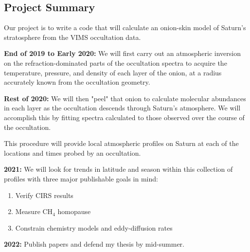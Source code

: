 \documentclass[preprint]{aastex}
\begin{document}
\begin{multicols}{2}
\vspace{-9mm}
\section{Project Summary}
\vspace{-3mm}

Our project is to write a code that will calculate an onion-skin model of
Saturn's stratosphere from the VIMS occultation data.

{\bf End of 2019 to Early 2020:} We will first carry out an atmospheric inversion on the
refraction-dominated parts of the occultation spectra to acquire the
temperature, pressure, and density of each layer of the onion, at a radius
accurately known from the occultation geometry. 

{\bf Rest of 2020:} We will then "peel" that onion to calculate molecular
abundances in each layer as the occultation descends through Saturn's
atmosphere. We will accomplish this by fitting spectra calculated to those
observed over the course of the occultation. 

This procedure will provide local atmospheric profiles on Saturn at each of the
locations and times probed by an occultation. 

{\bf 2021:} We will look for trends in latitude and season within this
collection of profiles with three major publishable goals in mind:
\begin{enumerate}
\item Verify CIRS results
\item Measure CH$_4$ homopause
\item Constrain chemistry models and eddy-diffusion rates
\end{enumerate}

{\bf 2022:} Publish papers and defend my thesis by mid-summer.

\end{multicols}


\pagebreak
\end{document}
